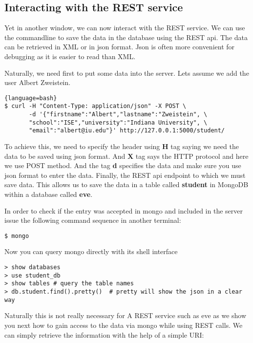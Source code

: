 \subsection{Interacting with the REST service}

Yet in another window, we can now interact with the REST service.
We can use the commandline to save the data in the database using the
REST api. The data can be retrieved in XML or in json format. Json is
often more convenient for debugging as it is easier to read than XML.

Naturally, we need first to put some data into the server. Lets assume
we add the user Albert Zweistein.

\begin{lstlisting}{language=bash}
$ curl -H "Content-Type: application/json" -X POST \
       -d '{"firstname":"Albert","lastname":"Zweistein", \
       "school":"ISE","university":"Indiana University", \
       "email":"albert@iu.edu"}' http://127.0.0.1:5000/student/
\end{lstlisting}

To achieve this, we need to specify the header using \textbf{H} tag
saying we need the data to be saved using json format. And \textbf{X}
tag says the HTTP protocol and here we use POST method. And the tag
\textbf{d} specifies the data and make sure you use json format to
enter the data. Finally, the REST api endpoint to which we must save
data. This allows us to save the data in a table called
\textbf{student} in MongoDB within a database called \textbf{eve}.

In order to check if the entry was accepted in mongo and included in the
server issue the following command sequence in another terminal:

\begin{lstlisting}
$ mongo
\end{lstlisting}

Now you can query mongo directly with its shell interface

\begin{lstlisting}
> show databases
> use student_db  
> show tables # query the table names
> db.student.find().pretty()  # pretty will show the json in a clear way
\end{lstlisting}

Naturally this is not really necessary for A REST service such as eve
as we show you next how to gain access to the data via mongo while
using REST calls. We can simply retrieve
the information with the help of a simple URI:



